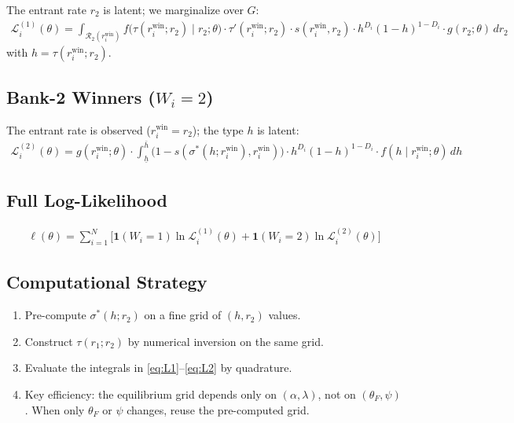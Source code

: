 \documentclass[12pt]{article}
\theoremstyle{plain}
\theoremstyle{plain}
\theoremstyle{definition}  %
\theoremstyle{remark}  %
\begin{document}
The entrant rate $r_2$ is latent; we marginalize over $G$:
\begin{align}\label{eq:L1}
    \boxed{\mathcal{L}_i^{(1)}(\theta) = \int_{\mathcal{R}_2(r_i^{\text{win}})} f\!\big(\tau(r_i^{\text{win}}; r_2) \mid r_2;\theta\big) \cdot \tau'(r_i^{\text{win}}; r_2) \cdot s(r_i^{\text{win}}, r_2) \cdot h^{D_i}(1\!-\!h)^{1-D_i} \cdot g(r_2;\theta)\, dr_2}
\end{align}
with $h = \tau(r_i^{\text{win}}; r_2)$.

\subsection{Bank-2 Winners ($W_i = 2$)}

The entrant rate is observed ($r_i^{\text{win}} = r_2$); the type $h$ is latent:
\begin{align}\label{eq:L2}
    \boxed{\mathcal{L}_i^{(2)}(\theta) = g(r_i^{\text{win}};\theta) \cdot \int_{\underline{h}}^{\bar{h}} \big(1-s(\sigma^*(h;r_i^{\text{win}}), r_i^{\text{win}})\big) \cdot h^{D_i}(1-h)^{1-D_i} \cdot f(h \mid r_i^{\text{win}};\theta)\, dh}
\end{align}

\subsection{Full Log-Likelihood}

\begin{align}\label{eq:L_full}
    \ell(\theta) = \sum_{i=1}^N \Big[\mathbf{1}(W_i=1)\ln \mathcal{L}_i^{(1)}(\theta) + \mathbf{1}(W_i=2)\ln \mathcal{L}_i^{(2)}(\theta)\Big]
\end{align}


\subsection{Computational Strategy}\label{sec:computation}

\begin{enumerate}
    \item Pre-compute $\sigma^*(h; r_2)$ on a fine grid of $(h, r_2)$ values.
    \item Construct $\tau(r_1; r_2)$ by numerical inversion on the same grid.
    \item Evaluate the integrals in \eqref{eq:L1}--\eqref{eq:L2} by quadrature.
    \item Key efficiency: the equilibrium grid depends only on $(\alpha, \lambda)$, not on $(\theta_F, \psi)$.  When only $\theta_F$ or $\psi$ changes, reuse the pre-computed grid.
\end{enumerate}
\end{document}
